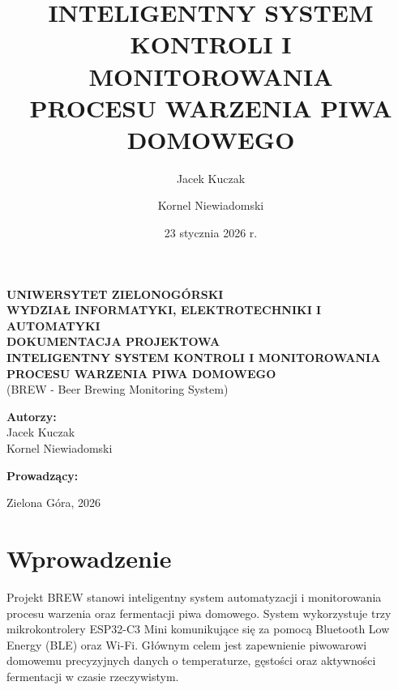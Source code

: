 \documentclass[12pt,a4paper]{article}
\title{\textbf{INTELIGENTNY SYSTEM KONTROLI I MONITOROWANIA\\PROCESU WARZENIA PIWA DOMOWEGO}}
\author{Jacek Kuczak \and Kornel Niewiadomski}
\date{23 stycznia 2026 r.}
\begin{document}
\thispagestyle{empty}
\begin{center}
    {\Large \textbf{UNIWERSYTET ZIELONOGÓRSKI}} \\
    \vspace{0.5cm}
    {\Large \textbf{WYDZIAŁ INFORMATYKI, ELEKTROTECHNIKI I AUTOMATYKI}} \\
    \vspace{3cm}
    {\huge \textbf{DOKUMENTACJA PROJEKTOWA}} \\
    \vspace{1cm}
    {\Large \textbf{INTELIGENTNY SYSTEM KONTROLI I MONITOROWANIA\\PROCESU WARZENIA PIWA DOMOWEGO}} \\
    \vspace{0.5cm}
    {\large (BREW - Beer Brewing Monitoring System)} \\
    \vspace{3cm}
    \begin{minipage}{0.4\textwidth}
        \begin{flushleft} \large
            \textbf{Autorzy:}\\
            Jacek Kuczak\\
            Kornel Niewiadomski
        \end{flushleft}
    \end{minipage}
    \begin{minipage}{0.4\textwidth}
        \begin{flushright} \large
            \textbf{Prowadzący:}\\
            [Imię Nazwisko Prowadzącego]
        \end{flushright}
    \end{minipage}
    \vfill
    {\large Zielona Góra, 2026}
\end{center}
\newpage

\tableofcontents
\newpage

\section{Wprowadzenie}
Projekt BREW stanowi inteligentny system automatyzacji i monitorowania procesu warzenia oraz fermentacji piwa domowego. System wykorzystuje trzy mikrokontrolery ESP32-C3 Mini komunikujące się za pomocą Bluetooth Low Energy (BLE) oraz Wi-Fi. Głównym celem jest zapewnienie piwowarowi domowemu precyzyjnych danych o temperaturze, gęstości oraz aktywności fermentacji w czasie rzeczywistym.
\end{document}

